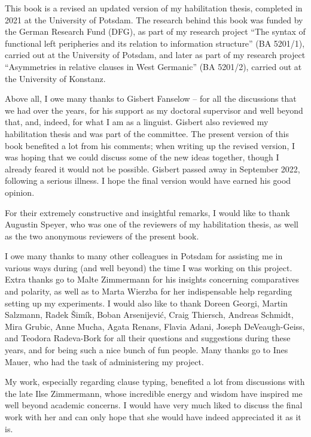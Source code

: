 \largerpage[2]

This book is a revised an updated version of my habilitation thesis, completed in 2021 at the University of Potsdam. The research behind this book was funded by the German Research Fund (DFG), as part of my research project ``The syntax of functional left peripheries and its relation to information structure'' (BA 5201/1), carried out at the University of Potsdam, and later as part of my research project ``Asymmetries in relative clauses in West Germanic'' (BA 5201/2), carried out at the University of Konstanz.

Above all, I owe many thanks to Gisbert Fanselow  -- for all the discussions that we had over the years, for his support as my doctoral supervisor and well beyond that, and, indeed, for what I am as a linguist. Gisbert also reviewed my habilitation thesis and was part of the committee. The present version of this book benefited a lot from his comments; when writing up the revised version, I was hoping that we could discuss some of the new ideas together, though I already feared it would not be possible. Gisbert passed away in September 2022, following a serious illness. I hope the final version would have earned his good opinion.

For their extremely constructive and insightful remarks, I would like to thank Augustin Speyer, who was one of the reviewers of my habilitation thesis, as well as the two anonymous reviewers of the present book.

I owe many thanks to many other colleagues in Potsdam for assisting me in various ways during (and well beyond) the time I was working on this project. Extra thanks go to Malte Zimmermann for his insights concerning comparatives and polarity, as well as to Marta Wierzba for her indispensable help regarding setting up my experiments. I would also like to thank Doreen Georgi, Martin Salzmann, Radek Šimík, Boban Arsenijević, Craig Thiersch, Andreas Schmidt, Mira Grubic, Anne Mucha, Agata Renans, Flavia Adani, Joseph DeVeaugh-Geiss, and Teodora Radeva-Bork for all their questions and suggestions during these years, and for being such a nice bunch of fun people. Many thanks go to Ines Mauer, who had the task of administering my  project.

My work, especially regarding clause typing, benefited a lot from discussions with the late Ilse Zimmermann, whose incredible energy and wisdom have inspired me well beyond academic concerns. I would have very much liked to discuss the final work with her and can only hope that she would have indeed appreciated it as it is.

